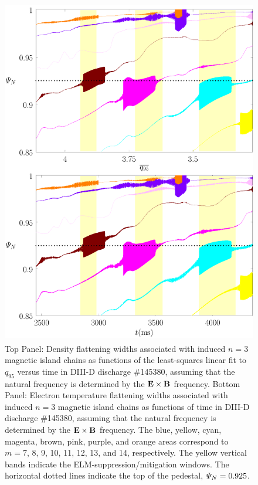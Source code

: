 \documentclass[12pt,prb,aps]{revtex4-1}
\begin{document}
\begin{figure}
\includegraphics[height=6in]{fig10.pdf}
\caption{Top Panel: Density flattening widths associated with induced $n=3$ magnetic island  chains as functions of the least-squares linear fit to $q_{95}$ versus time
in   DIII-D discharge \#145380, assuming that the natural frequency is  determined by the ${\bf E}\times {\bf B}$
frequency.
Bottom Panel:  Electron temperature flattening widths associated with induced $n=3$ magnetic island chains as functions of time
in   DIII-D discharge \#145380, assuming that the natural frequency is determined by the ${\bf E}\times {\bf B}$
frequency. The blue, yellow, cyan, magenta, brown, pink,
purple, and orange  areas correspond to $m=7$, 8, 9, 10, 11, 12, 13, and 14, respectively. The yellow vertical bands indicate the ELM-suppression/mitigation windows. 
The horizontal dotted lines indicate the top of the pedestal, ${\mit\Psi}_N=0.925$.} \label{fig10}
\end{figure}
\end{document}
